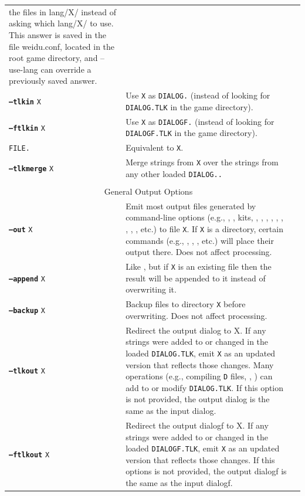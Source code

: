 \documentclass{article}
\def\ttref#1{\ahrefloc{#1}{\tt #1}}
\def\DEFINE#1{{\tt \bf #1}\label{#1}\index{#1}}
\def\t#1{{\tt #1}}
\begin{document}
\begin{tabular}{lp{10in}|p{10in}}
the files in lang/X/ instead of asking which lang/X/ to use. This
answer is saved in the file weidu.conf, located in the root game
directory, and --use-lang can override a previously saved answer.\\
\DEFINE{--tlkin} \t{X} & Use {\tt X} as {\tt DIALOG.}\ttref{TLK} (instead
of looking for \t{DIALOG.TLK} in the game directory). \\
\DEFINE{--ftlkin} \t{X} & Use {\tt X} as {\tt DIALOGF.}\ttref{TLK} (instead
of looking for \t{DIALOGF.TLK} in the game directory). \\
\tt{FILE.}\ttref{TLK} & Equivalent to \ttref{--tlkin} \t{X}. \\
\DEFINE{--tlkmerge} \t{X}	& Merge strings from {\tt X} over the strings from any other loaded {\tt \t{DIALOG.}\ttref{TLK}.} \\
\\
\multicolumn{2}{c}{ \color{red} General Output Options} \\
\DEFINE{--out} \t{X} &	Emit most output files generated by command-line
options (e.g., \ttref{D}, \ttref{DLG}, kits, \ttref{--biff-get},
\ttref{BAF}, \ttref{BCS}, \ttref{--automate}, \ttref{--traify-tlk},
\ttref{--extract-kits}, \ttref{--list-biffs}, \ttref{--cmp-from},
\ttref{--dcmp-from}, etc.) to file {\tt X}. If \t{X} is a directory,
certain commands (e.g., \ttref{D}, \ttref{DLG}, \ttref{--biff-get}, etc.)
will place their output there.  Does not affect \ttref{TP2} processing. \\
\DEFINE{--append} \t{X} & Like \ttref{--out}, but if \t{X} is an existing
file then the result will be appended to it instead of overwriting it. \\
\DEFINE{--backup} \t{X} &	Backup files to directory {\tt X} before overwriting. Does not affect \ttref{TP2} processing. \\
\DEFINE{--tlkout} \t{X} & Redirect the output dialog to X. If any strings were added to or changed in the loaded \t{DIALOG.TLK}, emit \t{X} as an updated version that reflects those changes. Many operations (e.g., compiling \t{D} files, \ttref{--tlkmerge}, \ttref{STRING_SET}) can add to or modify \t{DIALOG.TLK}. If this option is not provided, the output dialog is the same as the input dialog. \\
\DEFINE{--ftlkout} \t{X} & Redirect the output dialogf to X. If any strings were added to or changed in the
loaded \t{DIALOGF.TLK}, emit \t{X} as an updated version that reflects
those changes. If this options is not provided, the output dialogf is the same as the input dialogf. \\

\end{tabular}
\end{document}

